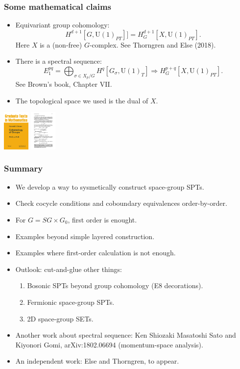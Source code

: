 \documentclass[xcolor=table, 10pt, aspectratio=43]{beamer}
\newcommand{\uone}{\mathrm U(1)}
\begin{document}
\begin{frame}
\frametitle{Some mathematical claims}
\begin{itemize}
\item Equivariant group cohomology:
\[H^{d+1}[G, \uone_{PT}]]=H^{d+1}_G[X, \uone_{PT}].\]
Here $X$ is a (non-free) $G$-complex. See Thorngren and Else (2018).
\item There is a spectral sequence:
\[E_1^{pq}=\bigoplus_{\sigma\in X_p/G}H^q[G_\sigma,\uone_T]\Rightarrow
H^{p+q}_G[X,\uone_{PT}].\]
See Brown's book, Chapter VII.
\item The topological space we used is the dual of $X$.
\end{itemize}
\begin{center}
	\includegraphics[height=2cm]{brown_book}
	\includegraphics[height=2cm]{brown_ss}
\end{center}
\end{frame}

\begin{frame}
\frametitle{Summary}
\begin{itemize}
\item We develop a way to sysmetically construct space-group SPTs.
\item Check cocycle conditions and coboundary equivalences order-by-order.
\item For $G=SG\times G_0$, first order is enought.
\item Examples beyond simple layered construction.
\item Examples where first-order calculation is not enough.
\item Outlook: cut-and-glue other things:
\begin{enumerate}
\item Bosonic SPTs beyond group cohomology (E8 decorations).
\item Fermionic space-group SPTs.
\item 2D space-group SETs.
\end{enumerate}
\item Another work about spectral sequence: Ken Shiozaki Masatoshi Sato and Kiyonori Gomi, arXiv:1802.06694 (momentum-space analysis).
\item An independent work: Else and Thorngren, to appear.
\end{itemize}
\end{frame}
\end{document}
